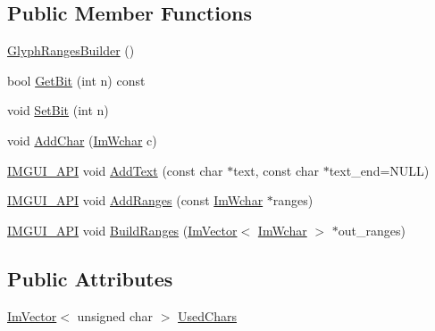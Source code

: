 \subsection*{Public Member Functions}
\begin{DoxyCompactItemize}
\item 
\mbox{\hyperlink{struct_im_font_atlas_1_1_glyph_ranges_builder_a3c8d81e21a62329830d4c36ca4a1fbc3}{Glyph\+Ranges\+Builder}} ()
\item 
bool \mbox{\hyperlink{struct_im_font_atlas_1_1_glyph_ranges_builder_a3402695bdeebd7528da9f143b385fb27}{Get\+Bit}} (int n) const
\item 
void \mbox{\hyperlink{struct_im_font_atlas_1_1_glyph_ranges_builder_aff570c016f17c1cd8d3a819b5f7a056c}{Set\+Bit}} (int n)
\item 
void \mbox{\hyperlink{struct_im_font_atlas_1_1_glyph_ranges_builder_a6b6b18e5c5fc4366afc98ff7391ba0bf}{Add\+Char}} (\mbox{\hyperlink{imgui_8h_af2c7badaf05a0008e15ef76d40875e97}{Im\+Wchar}} c)
\item 
\mbox{\hyperlink{imgui_8h_a43829975e84e45d1149597467a14bbf5}{I\+M\+G\+U\+I\+\_\+\+A\+PI}} void \mbox{\hyperlink{struct_im_font_atlas_1_1_glyph_ranges_builder_a6c0f9756dc8ea184920d5ff28bfdb669}{Add\+Text}} (const char $\ast$text, const char $\ast$text\+\_\+end=N\+U\+LL)
\item 
\mbox{\hyperlink{imgui_8h_a43829975e84e45d1149597467a14bbf5}{I\+M\+G\+U\+I\+\_\+\+A\+PI}} void \mbox{\hyperlink{struct_im_font_atlas_1_1_glyph_ranges_builder_a93174d62f8cf366528b654806ca7be49}{Add\+Ranges}} (const \mbox{\hyperlink{imgui_8h_af2c7badaf05a0008e15ef76d40875e97}{Im\+Wchar}} $\ast$ranges)
\item 
\mbox{\hyperlink{imgui_8h_a43829975e84e45d1149597467a14bbf5}{I\+M\+G\+U\+I\+\_\+\+A\+PI}} void \mbox{\hyperlink{struct_im_font_atlas_1_1_glyph_ranges_builder_aa55b5710971adef2e4c690a3e46de6d5}{Build\+Ranges}} (\mbox{\hyperlink{class_im_vector}{Im\+Vector}}$<$ \mbox{\hyperlink{imgui_8h_af2c7badaf05a0008e15ef76d40875e97}{Im\+Wchar}} $>$ $\ast$out\+\_\+ranges)
\end{DoxyCompactItemize}
\subsection*{Public Attributes}
\begin{DoxyCompactItemize}
\item 
\mbox{\hyperlink{class_im_vector}{Im\+Vector}}$<$ unsigned char $>$ \mbox{\hyperlink{struct_im_font_atlas_1_1_glyph_ranges_builder_a369924c3fbeeac0402a6c02d62dd4a71}{Used\+Chars}}
\end{DoxyCompactItemize}


